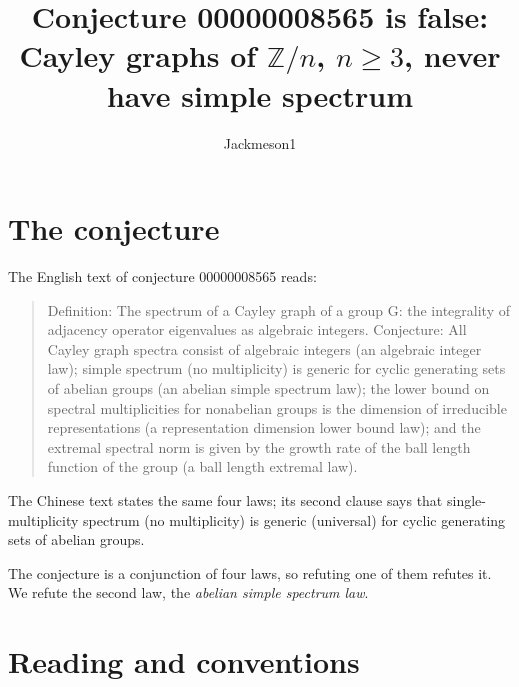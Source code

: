 \documentclass[11pt]{article}
\title{Conjecture 00000008565 is false:\\ Cayley graphs of $\mathbb{Z}/n$, $n\ge 3$, never have simple spectrum}
\author{Jackmeson1}
\date{}
\theoremstyle{definition}
\theoremstyle{remark}
\begin{document}
\maketitle

\section{The conjecture}

The English text of conjecture 00000008565 reads:

\begin{quote}
Definition: The spectrum of a Cayley graph of a group G: the integrality of adjacency operator
eigenvalues as algebraic integers. Conjecture: All Cayley graph spectra consist of algebraic
integers (an algebraic integer law); simple spectrum (no multiplicity) is generic for cyclic
generating sets of abelian groups (an abelian simple spectrum law); the lower bound on spectral
multiplicities for nonabelian groups is the dimension of irreducible representations (a
representation dimension lower bound law); and the extremal spectral norm is given by the growth
rate of the ball length function of the group (a ball length extremal law).
\end{quote}

The Chinese text states the same four laws; its second clause says that single-multiplicity
spectrum (no multiplicity) is generic (universal) for cyclic generating sets of abelian groups.

The conjecture is a conjunction of four laws, so refuting one of them refutes it. We refute the
second law, the \emph{abelian simple spectrum law}.

\section{Reading and conventions}
\end{document}
